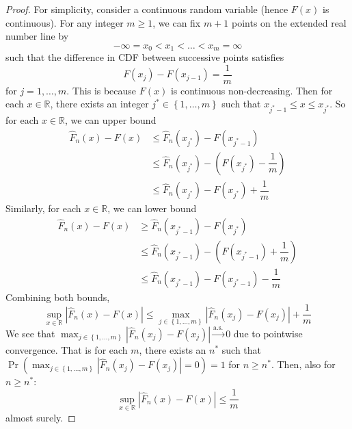 \documentclass[11pt]{report} %
\begin{document}
\begin{proof}
For simplicity, consider a continuous random variable (hence $F\left(x\right)$ is continuous). For any integer $m \geq 1$, we can fix $m + 1$ points on the extended real number line by
\begin{equation}
-\infty = x_{0} < x_{1} < \dots < x_{m} = \infty
\end{equation}
such that the difference in CDF between successive points satisfies
\begin{equation}
F\left(x_{j}\right) - F\left(x_{j - 1}\right) = \dfrac{1}{m}
\end{equation}
for $j = 1, \dots, m$. This is because $F\left(x\right)$ is continuous non-decreasing. Then for each $x \in \mathbb{R}$, there exists an integer $j^{*} \in \left\{1, \dots, m\right\}$ such that $x_{j^{*} - 1} \leq x \leq x_{j^{*}}$. So for each $x \in \mathbb{R}$, we can upper bound
\begin{align}
\widehat{F}_{n}\left(x\right) - F\left(x\right)  &\leq \widehat{F}_{n}\left(x_{j^{*}}\right) - F\left(x_{j^{*} - 1}\right) \\
&\leq \widehat{F}_{n}\left(x_{j^{*}}\right) - \left(F\left(x_{j^{*}}\right) - \dfrac{1}{m}\right) \\
&\leq \widehat{F}_{n}\left(x_{j^{*}}\right) - F\left(x_{j^{*}}\right) + \dfrac{1}{m}
\end{align} 
Similarly, for each $x \in \mathbb{R}$, we can lower bound
\begin{align}
\widehat{F}_{n}\left(x\right) - F\left(x\right)  &\geq \widehat{F}_{n}\left(x_{j^{*} - 1}\right) - F\left(x_{j^{*}}\right) \\
&\leq \widehat{F}_{n}\left(x_{j^{*} - 1}\right) - \left(F\left(x_{j^{*} - 1}\right) + \dfrac{1}{m}\right) \\
&\leq \widehat{F}_{n}\left(x_{j^{*} - 1}\right) - F\left(x_{j^{*} - 1}\right) - \dfrac{1}{m}
\end{align}
Combining both bounds,
\begin{equation}
\sup_{x \in \mathbb{R}}\left|\widehat{F}_{n}\left(x\right) - F\left(x\right)\right| \leq \max_{j \in \left\{1, \dots, m\right\}}\left|\widehat{F}_{n}\left(x_{j}\right) - F\left(x_{j}\right) \right| + \dfrac{1}{m}
\end{equation}
We see that $\max_{j \in \left\{1, \dots, m\right\}}\left|\widehat{F}_{n}\left(x_{j}\right) - F\left(x_{j}\right) \right| \overset{\mathrm{a.s.}}{\to} 0$ due to pointwise convergence. That is for each $m$, there exists an $n^{*}$ such that $\operatorname{Pr}\left(\max_{j \in \left\{1, \dots, m\right\}}\left|\widehat{F}_{n}\left(x_{j}\right) - F\left(x_{j}\right) \right| = 0\right) = 1$ for $n \geq n^{*}$. Then, also for $n \geq n^{*}$:\begin{equation}
\sup_{x \in \mathbb{R}}\left|\widehat{F}_{n}\left(x\right) - F\left(x\right)\right| \leq \dfrac{1}{m}
\end{equation}
almost surely.
\end{proof}
\end{document}
